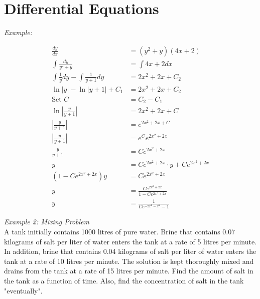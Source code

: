 \section{Differential Equations}

        \textit{Example:}

        \begin{align*}
                \frac{dy}{dx}                                   &= (y^2 + y)(4x+2) \\
                \int \frac{dy}{y^2+y}                           &= \int 4x + 2 dx \\
                \int \frac{1}{y}dy - \int \frac{1}{y+1}dy       &= 2x^2 + 2x + C_2 \\
                \ln{|y|} - \ln{|y+1|}+C_1                       &= 2x^2 + 2x + C_2 \\
                \text{Set } C                                   &= C_2 - C_1 \\
                \ln{\left|\frac{y}{y+1}\right|}                 &= 2x^2 + 2x + C \\
                \left|\frac{y}{y+1}\right|                      &= e^{2x^2+2x+C} \\
                \left|\frac{y}{y+1}\right|                      &= e^C e^{2x^2+2x} \\
                \frac{y}{y+1}                                   &= Ce^{2x^2+2x} \\
                y                                               &= Ce^{2x^2+2x}\cdot y + Ce^{2x^2+2x} \\
                \left(1-Ce^{2x^2+2x}\right)y                    &= Ce^{2x^2+2x} \\
                y                                               &= \frac{Ce^{2x^2+2x}}{1-Ce^{2x^2+2x}} \\
                y                                               &= \frac{1}{Ce^{-2x^2-x^2}-1}
        \end{align*}

        \textit{Example 2: Mixing Problem} \\
        A tank initially contains 1000 litres of pure water. Brine that contains 0.07 kilograms of salt per liter of water enters the tank at a rate of 5 litres per minute. In addition, brine that contains 0.04 kilograms
        of salt per liter of water enters the tank at a rate of 10 litres per minute. The solution is kept thoroughly mixed and drains from the tank at a rate of 15 litres per minute. Find the amount of salt in the tank
        as a function of time. Also, find the concentration of salt in the tank "eventually". \\

